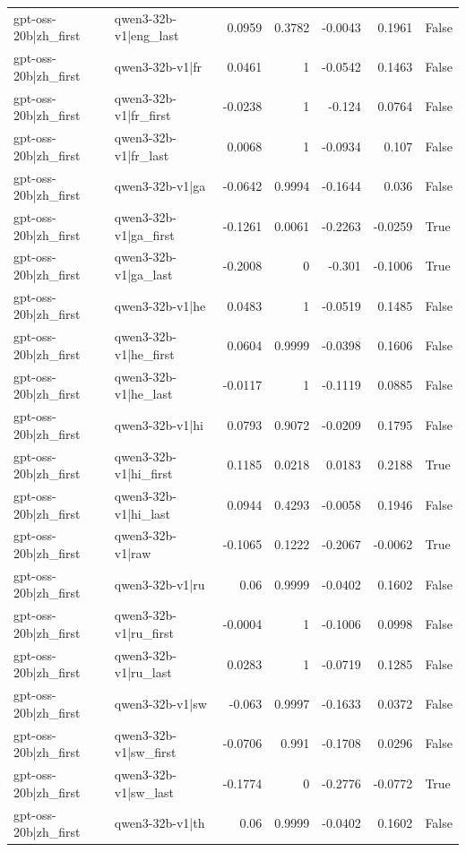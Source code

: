\begin{table}
\begin{tabular}{l l r r r r l}
gpt-oss-20b|zh_first & qwen3-32b-v1|eng_last & 0.0959 & 0.3782 & -0.0043 & 0.1961 & False \\
gpt-oss-20b|zh_first & qwen3-32b-v1|fr & 0.0461 & 1 & -0.0542 & 0.1463 & False \\
gpt-oss-20b|zh_first & qwen3-32b-v1|fr_first & -0.0238 & 1 & -0.124 & 0.0764 & False \\
gpt-oss-20b|zh_first & qwen3-32b-v1|fr_last & 0.0068 & 1 & -0.0934 & 0.107 & False \\
gpt-oss-20b|zh_first & qwen3-32b-v1|ga & -0.0642 & 0.9994 & -0.1644 & 0.036 & False \\
gpt-oss-20b|zh_first & qwen3-32b-v1|ga_first & -0.1261 & 0.0061 & -0.2263 & -0.0259 & True \\
gpt-oss-20b|zh_first & qwen3-32b-v1|ga_last & -0.2008 & 0 & -0.301 & -0.1006 & True \\
gpt-oss-20b|zh_first & qwen3-32b-v1|he & 0.0483 & 1 & -0.0519 & 0.1485 & False \\
gpt-oss-20b|zh_first & qwen3-32b-v1|he_first & 0.0604 & 0.9999 & -0.0398 & 0.1606 & False \\
gpt-oss-20b|zh_first & qwen3-32b-v1|he_last & -0.0117 & 1 & -0.1119 & 0.0885 & False \\
gpt-oss-20b|zh_first & qwen3-32b-v1|hi & 0.0793 & 0.9072 & -0.0209 & 0.1795 & False \\
gpt-oss-20b|zh_first & qwen3-32b-v1|hi_first & 0.1185 & 0.0218 & 0.0183 & 0.2188 & True \\
gpt-oss-20b|zh_first & qwen3-32b-v1|hi_last & 0.0944 & 0.4293 & -0.0058 & 0.1946 & False \\
gpt-oss-20b|zh_first & qwen3-32b-v1|raw & -0.1065 & 0.1222 & -0.2067 & -0.0062 & True \\
gpt-oss-20b|zh_first & qwen3-32b-v1|ru & 0.06 & 0.9999 & -0.0402 & 0.1602 & False \\
gpt-oss-20b|zh_first & qwen3-32b-v1|ru_first & -0.0004 & 1 & -0.1006 & 0.0998 & False \\
gpt-oss-20b|zh_first & qwen3-32b-v1|ru_last & 0.0283 & 1 & -0.0719 & 0.1285 & False \\
gpt-oss-20b|zh_first & qwen3-32b-v1|sw & -0.063 & 0.9997 & -0.1633 & 0.0372 & False \\
gpt-oss-20b|zh_first & qwen3-32b-v1|sw_first & -0.0706 & 0.991 & -0.1708 & 0.0296 & False \\
gpt-oss-20b|zh_first & qwen3-32b-v1|sw_last & -0.1774 & 0 & -0.2776 & -0.0772 & True \\
gpt-oss-20b|zh_first & qwen3-32b-v1|th & 0.06 & 0.9999 & -0.0402 & 0.1602 & False \\

\end{tabular}
\end{table}
